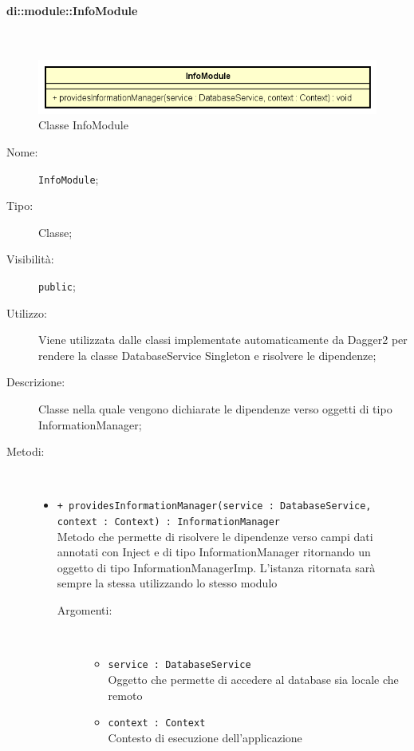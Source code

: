 \documentclass[../DefinizioneDiProdotto.tex]{subfiles}
\begin{document}
\paragraph{di::module::InfoModule}
\
\begin{figure}[H]
	\centering
	\includegraphics[width=\maxwidth]{img/InfoModule.png}
	\caption{Classe InfoModule}\label{fig:di::module::InfoModule} 
\end{figure}
\begin{description}
	\item[Nome:] \texttt{InfoModule};
	\item[Tipo:] Classe;
	\item[Visibilità:] \texttt{public};
	\item[Utilizzo:] Viene utilizzata dalle classi implementate automaticamente da Dagger2 per rendere la classe DatabaseService Singleton e risolvere le dipendenze;
	\item[Descrizione:] Classe nella quale vengono dichiarate le dipendenze verso oggetti di tipo InformationManager;
	\item[Metodi:] \
	\begin{itemize}
		\item \texttt{+ providesInformationManager(service : DatabaseService, context : Context) : InformationManager}\\
		Metodo che permette di risolvere le dipendenze verso campi dati annotati con Inject e di tipo InformationManager ritornando un oggetto di tipo InformationManagerImp. L'istanza ritornata sarà sempre la stessa utilizzando lo stesso modulo
		\begin{description}
			\item[Argomenti:] \
			\begin{itemize}
				\item \texttt{service : DatabaseService}\\
				Oggetto che permette di accedere al database sia locale che remoto\item \texttt{context : Context}\\
				Contesto di esecuzione dell'applicazione\end{itemize}
		\end{description}
	\end{itemize}
\end{description}
\end{document}

